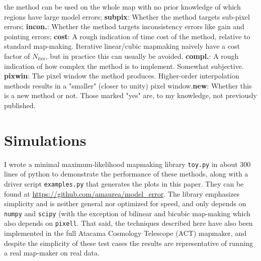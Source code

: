 \documentclass{article}
\newcommand{\code}[1]{\texttt{#1}}
\newcommand{\dfn}[1]{\textbf{#1}}
\begin{document}
\begin{table}
{		the method can be used on the whole map with no prior knowledge of which regions have
		large model errors; \dfn{subpix}: Whether the method targets sub-pixel errors;
		\dfn{incon.}: Whether the method targets inconsistency errors like gain and pointing
		errors; \dfn{cost}: A rough indication of time cost of the method, relative to
		standard map-making. Iterative linear/cubic mapmaking naively have a cost factor of
		$N_\textrm{iter}$, but in practice this can usually be avoided. \dfn{compl.}:
		A rough indication of how complex the method is to implement. Somewhat subjective.
		\dfn{pixwin}:
		The pixel window the method produces. Higher-order interpolation methods results in
		a "smaller" (closer to unity) pixel window.\dfn{new}: Whether this is a new
		method or not. Those marked "yes" are, to my knowledge, not previously published.}
	\label{tab:summary}
\end{table}

\section{Simulations}
I wrote a minimal maximum-likelihood
mapmaking library \code{toy.py} in about 300 lines of python to demonstrate the performance of these
methods, along with a driver script \code{examples.py}
that generates the plots in this paper. They can be found at \url{https://github.com/amaurea/model_error}.
The library emphasizes simplicity and is neither general
nor optimized for speed, and only depends on \code{numpy} and \code{scipy} (with
the exception of bilinear and bicubic map-making which also depends on \code{pixell}.
That said, the techniques described here have also been implemented in
the full Atacama Cosmology Telescope (ACT) mapmaker, and despite the simplicity of these test cases
the results are representative of running a real map-maker on real data.
\end{document}

